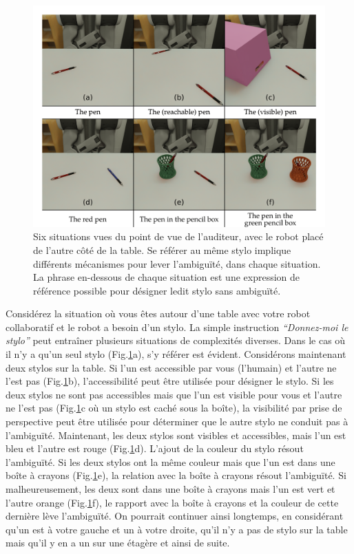 \begin{figure}[ht!]
\centering
\includegraphics[scale=0.16]{figures/chapter4/intro.png}
\caption{\label{fig:annex_chap4_intro} Six situations vues du point de vue de l'auditeur, avec le robot placé de l'autre côté de la table. Se référer au même stylo implique différents mécanismes pour lever l'ambiguïté, dans chaque situation. La phrase en-dessous de chaque situation est une expression de référence possible pour désigner ledit stylo sans ambiguïté.}
\end{figure}

Considérez la situation où vous êtes autour d'une table avec votre robot collaboratif et le robot a besoin d'un stylo. La simple instruction \textit{``Donnez-moi le stylo''} peut entraîner plusieurs situations de complexités diverses. Dans le cas où il n'y a qu'un seul stylo (Fig.\ref{fig:annex_chap4_intro}a), s'y référer est évident. Considérons maintenant deux stylos sur la table. Si l'un est accessible par vous (l'humain) et l'autre ne l'est pas (Fig.\ref{fig:annex_chap4_intro}b), l'accessibilité peut être utilisée pour désigner le stylo. Si les deux stylos ne sont pas accessibles mais que l'un est visible pour vous et l'autre ne l'est pas (Fig.\ref{fig:annex_chap4_intro}c où un stylo est caché sous la boîte), la visibilité par prise de perspective peut être utilisée pour déterminer que le autre stylo ne conduit pas à l'ambiguïté. Maintenant, les deux stylos sont visibles et accessibles, mais l'un est bleu et l'autre est rouge (Fig.\ref{fig:annex_chap4_intro}d). L'ajout de la couleur du stylo résout l'ambiguïté. Si les deux stylos ont la même couleur mais que l'un est dans une boîte à crayons (Fig.\ref{fig:annex_chap4_intro}e), la relation avec la boîte à crayons résout l'ambiguïté. Si malheureusement, les deux sont dans une boîte à crayons mais l'un est vert et l'autre orange (Fig.\ref{fig:annex_chap4_intro}f), le rapport avec la boîte à crayons et la couleur de cette dernière lève l'ambiguïté. On pourrait continuer ainsi longtemps, en considérant qu'un est à votre gauche et un à votre droite, qu'il n'y a pas de stylo sur la table mais qu'il y en a un sur une étagère et ainsi de suite.

